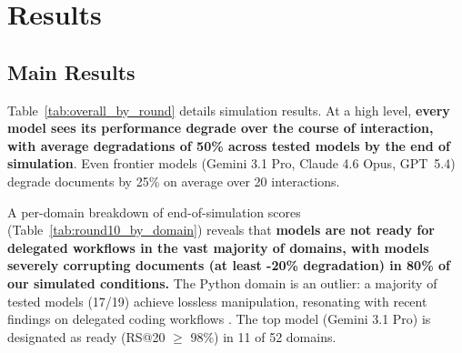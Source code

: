 \documentclass{article} %
\begin{document}
\vspace{3\intextsep}

\section{Results} \label{sec:results}

\begin{table}
    \vspace{-7\intextsep}
    
    \caption{Round-trip relay results for 19 LLMs on \benchmark{} (20 interactions). All models accumulate errors, leading to significant document corruption. Background color: degradation from the seed document.}
    \label{tab:overall_by_round}
    \vspace{-1\intextsep}
\end{table}

\subsection{Main Results} \label{sec:main_results}

Table~\ref{tab:overall_by_round} details simulation results. At a high level, \textbf{every model sees its performance degrade over the course of interaction, with average degradations of 50\% across tested models by the end of simulation}. Even frontier models (Gemini 3.1 Pro, Claude 4.6 Opus, GPT~5.4) degrade documents by 25\% on average over 20 interactions.

A per-domain breakdown of end-of-simulation scores (Table~\ref{tab:round10_by_domain}) reveals that \textbf{models are not ready for delegated workflows in the vast majority of domains, with models severely corrupting documents (at least -20\% degradation) in 80\% of our simulated conditions.} The Python domain is an outlier: a majority of tested models (17/19) achieve lossless manipulation, resonating with recent findings on delegated coding workflows \citep{Pimenova2025GoodVA}. The top model (Gemini 3.1 Pro) is designated as ready (RS@20 $\geq$ 98\%) in 11 of 52 domains.
\end{document}
